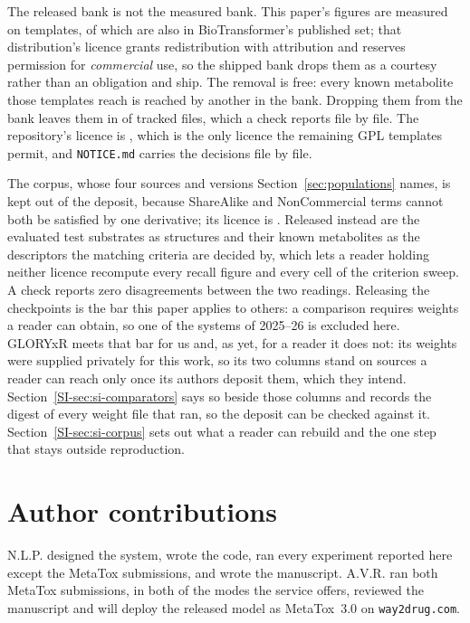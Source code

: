 The released bank is not the measured bank. This paper's figures are measured on
\numRelbankMeasured{} templates, of which \numRelbankRemoved{} are also in BioTransformer's
published set; that distribution's licence grants redistribution with attribution and reserves
permission for \emph{commercial} use, so the shipped bank drops them as a courtesy rather than an
obligation and \numRelbankReleased{} ship. The removal is free: every known metabolite those templates
reach is reached by another in the bank. Dropping them from the bank leaves them in
\numRelbankCarriersWord{} of \numRelbankCarrierscanned{} tracked files, which a check reports
file by file. The repository's
licence is \RepoLicence{}, which is the only licence the remaining GPL templates permit, and \texttt{NOTICE.md} carries the decisions file by file.

The corpus, whose four sources and versions Section~\ref{sec:populations} names, is kept out of
the deposit, because ShareAlike and NonCommercial terms cannot both be satisfied by one
derivative; its licence is \CorpusLicence{}. Released instead are the evaluated test substrates
as structures and their known metabolites as the descriptors the matching criteria are decided
by, which lets a reader holding neither licence recompute every recall figure and every cell of
the criterion sweep. A check reports zero disagreements between the two readings. Releasing the
checkpoints is the bar this paper applies to others: a comparison requires weights a reader can
obtain, so one of the \numComparatorsUnavailable{} systems of 2025--26 is excluded here. GLORYxR meets that bar for us and, as yet, for a reader it does not:
its weights were supplied privately for this work, so its two columns stand on sources a reader
can reach only once its authors deposit them, which they intend. Section~\ref{SI-sec:si-comparators}
says so beside those columns and records the digest of every weight file that ran, so the deposit
can be checked against it. Section~\ref{SI-sec:si-corpus} sets out what a reader can rebuild and
the one step that stays outside reproduction.

\section{Author contributions}

N.L.P. designed the system, wrote the code, ran every experiment reported here except the MetaTox
submissions, and wrote the manuscript. A.V.R. ran both MetaTox submissions, in both of the modes
the service offers, reviewed the manuscript and will deploy the released model as MetaTox~3.0 on
\texttt{way2drug.com}.

